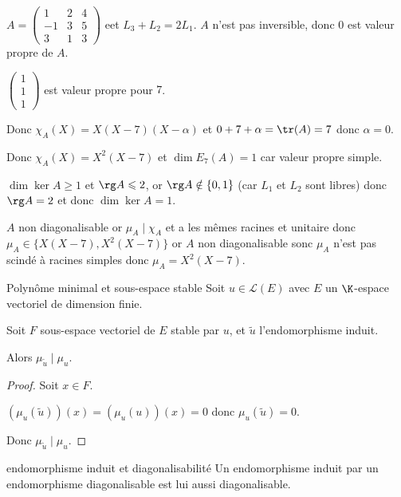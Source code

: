 \begin{exemple}
    $A = \begin{pmatrix}
        1 & 2 & 4 \\
        -1 & 3 & 5 \\
        3 & 1 & 3 
    \end{pmatrix}$ eet $L_3 + L_2 = 2L_1$. $A$ n'est pas inversible, donc $0$ est valeur propre de $A$.

    $\begin{pmatrix}
        1 \\ 1 \\ 1
    \end{pmatrix}$ est valeur propre pour $7$. 

    Donc $\chi_A(X) = X(X - 7)(X - \alpha)$ et $0 + 7 + \alpha = \tr(A) = 7$ donc $\alpha = 0$.

    Donc $\chi_A(X) = X^2 (X - 7)$ et $\dim E_7(A) = 1$ car valeur propre simple.

    $\dim \ker A \geqslant 1$ et $\rg A \leqslant 2$, or $\rg A \notin \{0, 1\}$ (car $L_1$ et $L_2$
    sont libres) donc $\rg A = 2$ et donc $\dim \ker A = 1$.

    $A$ non diagonalisable or $\mu_A \mid \chi_A$ et a les mêmes racines et unitaire donc 
    $\mu_A \in \{X(X - 7), X^2(X - 7)\}$ or $A$ non diagonalisable sonc $\mu_A$ n'est pas scindé à racines simples donc 
    $\mu_A = X^2 (X - 7)$.
\end{exemple}

\begin{proposition}{Polynôme minimal et sous-espace stable}{}
    Soit $u \in \mathscr L(E)$ avec $E$ un $\K$-espace vectoriel de dimension finie. 

    Soit $F$ sous-espace vectoriel de $E$ stable par $u$, et $\tilde u$ l'endomorphisme induit. 

    Alors $\mu_{\tilde u} \mid \mu_u$.
\end{proposition}


\begin{proof}
    Soit $x \in F$.

    $(\mu_u(\tilde u))(x) = (\mu_u(u))(x) = 0$ donc $\mu_u(\tilde u) = 0$.

    Donc $\mu_{\tilde u} \mid \mu_u$.
\end{proof}

\begin{corollaire}{endomorphisme induit et diagonalisabilité}{}
    Un endomorphisme induit par un endomorphisme diagonalisable est lui aussi diagonalisable.
\end{corollaire}

